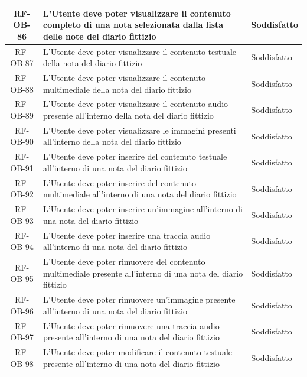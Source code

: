 \documentclass[a4paper,12pt]{article}
\begin{document}
\begin{center}
\begin{longtable}{|c|p{8.5cm}|>{\centering\arraybackslash}p{4cm}|}
RF-OB-86 & L'Utente deve poter visualizzare il contenuto completo di una nota selezionata dalla lista delle note del diario fittizio & Soddisfatto \\
\hline

RF-OB-87 & L'Utente deve poter visualizzare il contenuto testuale della nota del diario fittizio & Soddisfatto \\
\hline

RF-OB-88 & L'Utente deve poter visualizzare il contenuto multimediale della nota del diario fittizio & Soddisfatto \\
\hline

RF-OB-89 & L'Utente deve poter visualizzare il contenuto audio presente all'interno della nota del diario fittizio & Soddisfatto \\
\hline

RF-OB-90 & L'Utente deve poter visualizzare le immagini presenti all'interno della nota del diario fittizio & Soddisfatto \\
\hline

RF-OB-91 & L'Utente deve poter inserire del contenuto testuale all'interno di una nota del diario fittizio & Soddisfatto \\
\hline

RF-OB-92 & L'Utente deve poter inserire del contenuto multimediale all'interno di una nota del diario fittizio & Soddisfatto \\
\hline

RF-OB-93 & L'Utente deve poter inserire un'immagine all'interno di una nota del diario fittizio & Soddisfatto \\
\hline

RF-OB-94 & L'Utente deve poter inserire una traccia audio all'interno di una nota del diario fittizio & Soddisfatto \\
\hline

RF-OB-95 & L'Utente deve poter rimuovere del contenuto multimediale presente all'interno di una nota del diario fittizio & Soddisfatto \\
\hline

RF-OB-96 & L'Utente deve poter rimuovere un'immagine presente all'interno di una nota del diario fittizio & Soddisfatto \\
\hline

RF-OB-97 & L'Utente deve poter rimuovere una traccia audio presente all'interno di una nota del diario fittizio & Soddisfatto \\
\hline

RF-OB-98 & L'Utente deve poter modificare il contenuto testuale presente all'interno di una nota del diario fittizio & Soddisfatto \\
\hline


\end{longtable}
\end{center}
\end{document}
